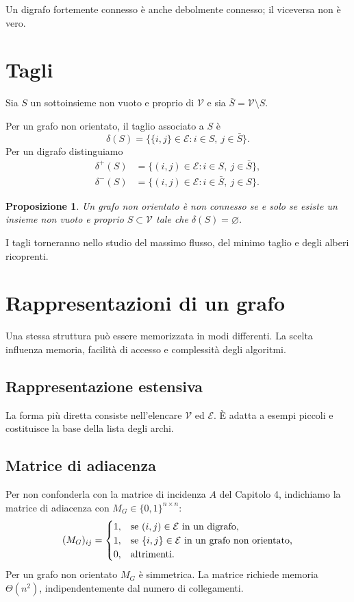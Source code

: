 \documentclass[11pt,a4paper]{article}
\newtheorem{proposition}[definition]{Proposizione}
\newcommand{\V}{\mathcal{V}}
\newcommand{\E}{\mathcal{E}}
\newcommand{\deltaout}{\delta^{+}}
\newcommand{\deltain}{\delta^{-}}
\begin{document}
Un digrafo fortemente connesso è anche debolmente connesso; il viceversa non è vero.

\section{Tagli}

Sia $S$ un sottoinsieme non vuoto e proprio di $\V$ e sia $\bar S=\V\setminus S$.

Per un grafo non orientato, il taglio associato a $S$ è
\[
\delta(S)=\{\{i,j\}\in\E:i\in S,\ j\in\bar S\}.
\]
Per un digrafo distinguiamo
\begin{align*}
\deltaout(S)&=\{(i,j)\in\E:i\in S,\ j\in\bar S\},\\
\deltain(S)&=\{(i,j)\in\E:i\in\bar S,\ j\in S\}.
\end{align*}

\begin{proposition}
Un grafo non orientato è non connesso se e solo se esiste un insieme non vuoto e proprio $S\subset\V$ tale che $\delta(S)=\varnothing$.
\end{proposition}

I tagli torneranno nello studio del massimo flusso, del minimo taglio e degli alberi ricoprenti.

\section{Rappresentazioni di un grafo}

Una stessa struttura può essere memorizzata in modi differenti. La scelta influenza memoria, facilità di accesso e complessità degli algoritmi.

\subsection{Rappresentazione estensiva}

La forma più diretta consiste nell'elencare $\V$ ed $\E$. È adatta a esempi piccoli e costituisce la base della lista degli archi.

\subsection{Matrice di adiacenza}

Per non confonderla con la matrice di incidenza $A$ del Capitolo 4, indichiamo la matrice di adiacenza con $M_G\in\{0,1\}^{n\times n}$:
\[
(M_G)_{ij}=\begin{cases}
1,&\text{se $(i,j)\in\E$ in un digrafo,}\cr
1,&\text{se $\{i,j\}\in\E$ in un grafo non orientato,}\cr
0,&\text{altrimenti.}
\end{cases}
\]
Per un grafo non orientato $M_G$ è simmetrica. La matrice richiede memoria $\Theta(n^2)$, indipendentemente dal numero di collegamenti.
\end{document}
